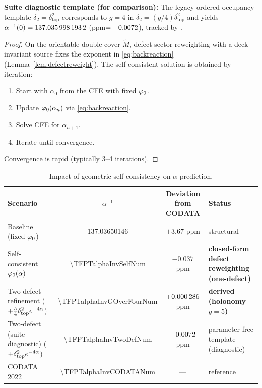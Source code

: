 \begin{remark}
\textbf{Suite diagnostic template (for comparison):} The legacy ordered-occupancy template $\delta_2=\delta_{\mathrm{top}}^2$ corresponds to $g=4$ in $\delta_2=(g/4)\delta_{\mathrm{top}}^2$ and yields
$\alpha^{-1}(0)=\num[round-mode=places,round-precision=10]{\TFPTalphaInvTwoDefNum}$ (ppm$=\num[round-mode=places,round-precision=4]{\TFPTalphaPpmTwoDefNum}$), tracked by .
\end{remark}

\begin{proof}
On the orientable double cover $\widetilde{M}$, defect-sector reweighting with a
deck-invariant source fixes the exponent in \eqref{eq:backreaction}
(Lemma~\ref{lem:defectreweight}). The self-consistent solution is obtained by iteration:
\begin{enumerate}
    \item Start with $\alpha_0$ from the CFE with fixed $\varphi_0$.
    \item Update $\varphi_0(\alpha_n)$ via \eqref{eq:backreaction}.
    \item Solve CFE for $\alpha_{n+1}$.
    \item Iterate until convergence.
\end{enumerate}
Convergence is rapid (typically 3--4 iterations).
\end{proof}

\begin{table}[H]
\centering
\small
\setlength{\tabcolsep}{4pt}
\begin{tabularx}{\linewidth}{@{}lccX@{}}
\toprule
\textbf{Scenario} & $\alpha^{-1}$ & \textbf{Deviation from CODATA} & \textbf{Status}\\
\midrule
Baseline (fixed $\varphi_0$) & 137.03650146 & $+3.67$ ppm & structural\\
Self-consistent $\varphi_0(\alpha)$ & \num[round-mode=places,round-precision=10]{\TFPTalphaInvSelfNum} & $-0.037$ ppm & \textbf{closed-form defect reweighting (one-defect)}\\
Two-defect refinement ($+\tfrac54\delta_{\mathrm{top}}^2 e^{-4\alpha}$) & \num[round-mode=places,round-precision=12]{\TFPTalphaInvGOverFourNum} & $+\num[round-mode=places,round-precision=6]{\TFPTalphaPpmGOverFourNum}$ ppm & \textbf{derived (holonomy $g=5$)}\\
Two-defect (suite diagnostic) ($+\delta_{\mathrm{top}}^2 e^{-4\alpha}$) & \num[round-mode=places,round-precision=10]{\TFPTalphaInvTwoDefNum} & $\num[round-mode=places,round-precision=4]{\TFPTalphaPpmTwoDefNum}$ ppm & parameter-free template (diagnostic)\\
CODATA 2022 & \num[round-mode=places,round-precision=9]{\TFPTalphaInvCODATANum} & --- & reference\\
\bottomrule
\end{tabularx}
\caption{Impact of geometric self-consistency on $\alpha$ prediction.}
\label{tab:alpha}
\end{table}

